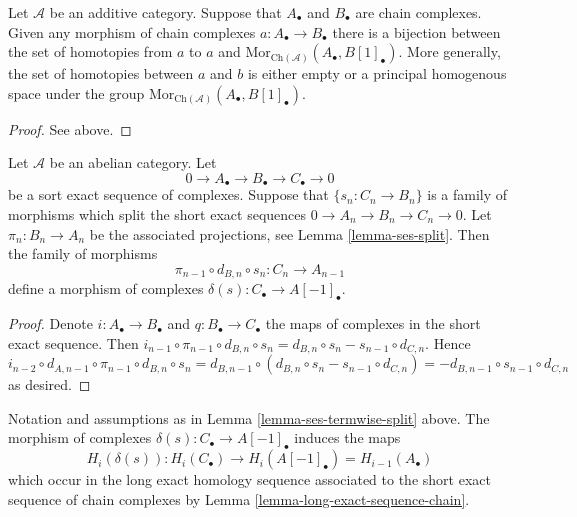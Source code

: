 \begin{lemma}
\label{lemma-homotopy-shift}
Let $\mathcal{A}$ be an additive category.
Suppose that $A_\bullet$ and $B_\bullet$ are
chain complexes. Given any morphism of chain
complexes $a : A_\bullet \to B_\bullet$ there
is a bijection between the set of homotopies
from $a$ to $a$ and
$\text{Mor}_{\text{Ch}(\mathcal{A})}(A_\bullet, B[1]_\bullet)$.
More generally, the set of homotopies between
$a$ and $b$ is either empty or a principal homogenous
space under the group
$\text{Mor}_{\text{Ch}(\mathcal{A})}(A_\bullet, B[1]_\bullet)$.
\end{lemma}

\begin{proof}
See above.
\end{proof}

\begin{lemma}
\label{lemma-ses-termwise-split}
Let $\mathcal{A}$ be an abelian category.
Let
$$
0 \to A_\bullet \to B_\bullet \to C_\bullet \to 0
$$
be a sort exact sequence of complexes.
Suppose that $\{s_n : C_n \to B_n\}$ is a family
of morphisms which split the short exact sequences
$0 \to A_n \to B_n \to C_n \to 0$. Let
$\pi_n : B_n \to A_n$ be the associated
projections, see Lemma \ref{lemma-ses-split}.
Then the family of morphisms
$$
\pi_{n - 1} \circ d_{B, n} \circ s_n
:
C_n \to A_{n - 1}
$$
define a morphism of complexes $\delta(s) : C_\bullet \to A[-1]_\bullet$.
\end{lemma}

\begin{proof}
Denote $i : A_\bullet \to B_\bullet$ and $q : B_\bullet \to C_\bullet$
the maps of complexes in the short exact sequence. Then
$i_{n - 1} \circ \pi_{n - 1} \circ d_{B, n} \circ s_n =
d_{B, n} \circ s_n - s_{n - 1} \circ d_{C, n}$. Hence
$i_{n - 2} \circ d_{A, n - 1} \circ \pi_{n - 1} \circ d_{B, n} \circ s_n =
d_{B, n - 1} \circ (d_{B, n} \circ s_n - s_{n - 1} \circ d_{C, n}) =
- d_{B, n - 1} \circ s_{n - 1} \circ d_{C, n}$ as desired.
\end{proof}

\begin{lemma}
\label{lemma-ses-termwise-split-long}
Notation and assumptions as in Lemma \ref{lemma-ses-termwise-split} above.
The morphism of complexes $\delta(s) : C_\bullet \to A[-1]_\bullet$
induces the maps
$$
H_i(\delta(s)) :
H_i(C_\bullet) \longrightarrow H_i(A[-1]_\bullet) = H_{i - 1}(A_\bullet)
$$
which occur in the long exact homology sequence associated
to the short exact sequence of chain complexes by
Lemma \ref{lemma-long-exact-sequence-chain}.
\end{lemma}

